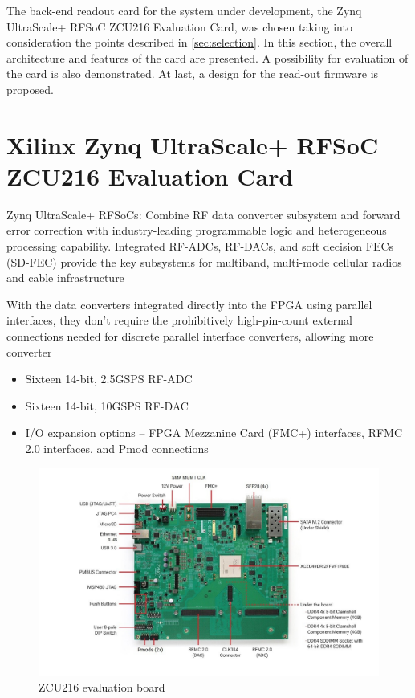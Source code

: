 The back-end readout card for the system under development, the Zynq UltraScale+ RFSoC ZCU216 Evaluation Card, was chosen taking into consideration the points described in \autoref{sec:selection}. In this section, the overall architecture and features of the card are presented. A possibility for evaluation of the card is also demonstrated. At last, a design for the read-out firmware is proposed. 

\section{Xilinx Zynq UltraScale+ RFSoC ZCU216 Evaluation Card}
Zynq UltraScale+ RFSoCs: Combine RF data converter subsystem and forward error correction with industry-leading
programmable logic and heterogeneous processing capability. Integrated RF-ADCs, RF-DACs, and soft decision FECs (SD-FEC)
provide the key subsystems for multiband, multi-mode cellular radios and cable infrastructure


With the data converters integrated directly into the FPGA using parallel interfaces, they don't require the
prohibitively high-pin-count external connections needed for discrete parallel interface converters, allowing more converter

\begin{itemize}[noitemsep]
	\item Sixteen 14-bit, 2.5GSPS RF-ADC
	\item Sixteen 14-bit, 10GSPS RF-DAC
	\item I/O expansion options – FPGA Mezzanine Card (FMC+) interfaces, RFMC 2.0 interfaces, and Pmod connections
\end{itemize}
\begin{figure}[tbh]
	\centering
	\includegraphics[width = \textwidth]{chap/04-work/img/zcu216}
	\caption{ZCU216 evaluation board}
	\label{fig:zcu216}
\end{figure}

